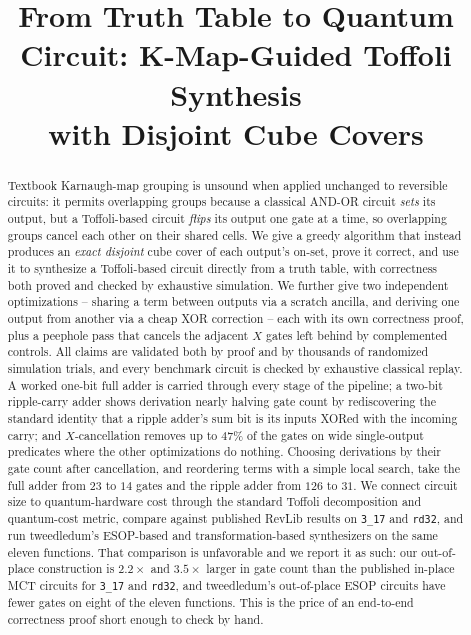 \documentclass[conference]{IEEEtran}
\theoremstyle{plain}
\begin{document}
\title{From Truth Table to Quantum Circuit: K-Map-Guided Toffoli Synthesis\\with Disjoint Cube Covers}
\author{
}

\maketitle

\begin{abstract}
Textbook Karnaugh-map grouping is unsound when applied unchanged to
reversible circuits: it permits overlapping groups because a classical
AND-OR circuit \emph{sets} its output, but a Toffoli-based circuit
\emph{flips} its output one gate at a time, so overlapping groups cancel
each other on their shared cells. We give a greedy algorithm that instead
produces an \emph{exact disjoint} cube cover of each output's on-set,
prove it correct, and use it to synthesize a Toffoli-based circuit
directly from a truth table, with correctness both proved and checked by
exhaustive simulation.
We further give two independent optimizations -- sharing a term between
outputs via a scratch ancilla, and deriving one output from another via a
cheap XOR correction -- each with its own correctness proof, plus a
peephole pass that cancels the adjacent $X$ gates left behind by
complemented controls. All claims are validated both by proof and by
thousands of randomized simulation trials, and every benchmark circuit is
checked by exhaustive classical replay. A worked one-bit full adder is
carried through every stage of the pipeline; a two-bit ripple-carry adder
shows derivation nearly halving gate count by rediscovering the standard
identity that a ripple adder's sum bit is its inputs XORed with the
incoming carry; and $X$-cancellation removes up to $47\%$ of the gates on
wide single-output predicates where the other optimizations do nothing.
Choosing derivations by their gate count after cancellation, and
reordering terms with a simple local search, take the full adder from
$23$ to $14$ gates and the ripple adder from $126$ to $31$.
We connect circuit size to quantum-hardware cost through the standard
Toffoli decomposition and quantum-cost metric, compare against published
RevLib results on \texttt{3\_17} and \texttt{rd32}, and run tweedledum's
ESOP-based and transformation-based synthesizers on the same eleven
functions. That comparison is unfavorable and we report it as such: our
out-of-place construction is $2.2\times$ and $3.5\times$ larger in gate
count than the published in-place MCT circuits for \texttt{3\_17} and
\texttt{rd32}, and tweedledum's out-of-place ESOP circuits have fewer gates
on eight of the eleven functions. This is the price of an end-to-end
correctness proof short enough to check by hand.
\end{abstract}
\end{document}
